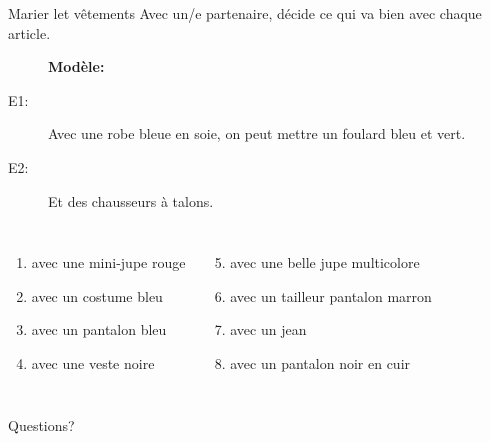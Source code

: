 \documentclass{beamer}
\begin{document}
  \begin{frame}{Marier let vêtements}
    Avec un/e partenaire, décide ce qui va bien avec chaque article. \\
    \begin{description}
      \item[] \textbf{Modèle:} 
      \item[E1:] Avec une robe bleue en soie, on peut mettre un foulard bleu et vert.
      \item[] 
      \item[E2:] Et des chausseurs à talons.
      \item[] 
    \end{description}
    \begin{columns}
        \begin{enumerate}
          \item avec une mini-jupe rouge
          \item avec un costume bleu
          \item avec un pantalon bleu
          \item avec une veste noire
        \end{enumerate}
        \begin{enumerate}
          \setcounter{enumi}{4}
          \item avec une belle jupe multicolore
          \item avec un tailleur pantalon marron
          \item avec un jean
          \item avec un pantalon noir en cuir
        \end{enumerate}
    \end{columns}
  \end{frame}

  \begin{frame}{}
    \begin{center}
      \Large Questions?
    \end{center}
  \end{frame}
\end{document}
